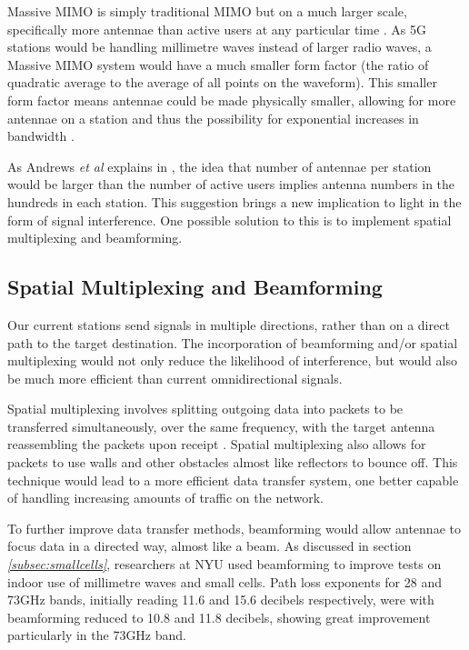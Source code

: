 \documentclass[journal]{IEEEtran}
\begin{document}
Massive MIMO is simply traditional MIMO but on a much larger scale, specifically more antennae than active users at any particular time \cite{whatwill5gbe}. As 5G stations would be handling millimetre waves instead of larger radio waves, a Massive MIMO system would have a much smaller form factor (the ratio of quadratic average to the average of all points on the waveform). This smaller form factor means antennae could be made physically smaller, allowing for more antennae on a station and thus the possibility for exponential increases in bandwidth \cite{mimo}.

As Andrews \textit{et al} explains in \cite{whatwill5gbe}, the idea that number of antennae per station would be larger than the number of active users implies antenna numbers in the hundreds in each station. This suggestion brings a new implication to light in the form of signal interference. One possible solution to this is to implement spatial multiplexing and beamforming.

\subsection{Spatial Multiplexing and Beamforming}\label{subsec:beamspac}
Our current stations send signals in multiple directions, rather than on a direct path to the target destination. The incorporation of beamforming and/or spatial multiplexing would not only reduce the likelihood of interference, but would also be much more efficient than current omnidirectional signals.

Spatial multiplexing involves splitting outgoing data into packets to be transferred simultaneously, over the same frequency, with the target antenna reassembling the packets upon receipt \cite{beam_sm}. Spatial multiplexing also allows for packets to use walls and other obstacles almost like reflectors to bounce off. This technique would lead to a more efficient data transfer system, one better capable of handling increasing amounts of traffic on the network.

To further improve data transfer methods, beamforming would allow antennae to focus data in a directed way, almost like a beam. As discussed in section \textit{\ref{subsec:smallcells}}, researchers at NYU used beamforming to improve tests on indoor use of millimetre waves and small cells. Path loss exponents for 28 and 73GHz bands, initially reading 11.6 and 15.6 decibels respectively, were with beamforming reduced to 10.8 and 11.8 decibels, showing great improvement particularly in the 73GHz band.
\end{document}
